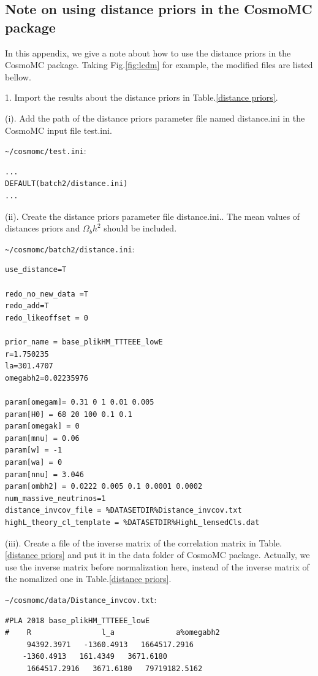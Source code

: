 \documentclass[floatfix,aps,amsmath,nofootinbib,onecolumn,10pt]{revtex4}
\begin{document}
\begin{appendix}
\section{Note on using distance priors in the CosmoMC package}

In this appendix, we give a note about how to use the  distance priors in the CosmoMC package. Taking Fig.\ref{fig:lcdm} for example, the modified files are listed bellow.

1. Import the results about the distance priors in Table.\ref{distance priors}.

(i). Add the path of the distance priors parameter file named distance.ini in the CosmoMC input file test.ini.

\verb|~/cosmomc/test.ini|:
\begin{lstlisting}
...
DEFAULT(batch2/distance.ini)
...
\end{lstlisting}

(ii). Create the distance priors parameter file distance.ini.. The mean values of distances priors and $\Omega_b h^2$ should be included. 

\verb|~/cosmomc/batch2/distance.ini|:
\begin{lstlisting}
use_distance=T

redo_no_new_data =T
redo_add=T
redo_likeoffset = 0

prior_name = base_plikHM_TTTEEE_lowE
r=1.750235
la=301.4707
omegabh2=0.02235976

param[omegam]= 0.31 0 1 0.01 0.005
param[H0] = 68 20 100 0.1 0.1
param[omegak] = 0
param[mnu] = 0.06
param[w] = -1 
param[wa] = 0 
param[nnu] = 3.046
param[ombh2] = 0.0222 0.005 0.1 0.0001 0.0002
num_massive_neutrinos=1
distance_invcov_file = %DATASETDIR%Distance_invcov.txt
highL_theory_cl_template = %DATASETDIR%HighL_lensedCls.dat
\end{lstlisting}

(iii).  Create a file of the inverse matrix of the correlation matrix in Table.\ref{distance priors} and put it in the data folder of CosmoMC package. Actually, we use the inverse matrix before normalization here, instead of the inverse matrix of the nomalized one in Table.\ref{distance priors}.

\verb|~/cosmomc/data/Distance_invcov.txt|:
\begin{lstlisting}
#PLA 2018 base_plikHM_TTTEEE_lowE
#    R                l_a              a%omegabh2       
     94392.3971   -1360.4913   1664517.2916   
    -1360.4913   161.4349   3671.6180   
     1664517.2916   3671.6180   79719182.5162  
\end{lstlisting}


\end{appendix}
\end{document}
